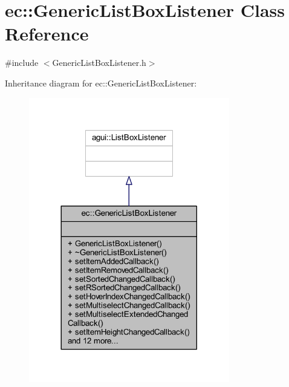 \hypertarget{classec_1_1_generic_list_box_listener}{}\section{ec\+:\+:Generic\+List\+Box\+Listener Class Reference}
\label{classec_1_1_generic_list_box_listener}


{\ttfamily \#include $<$Generic\+List\+Box\+Listener.\+h$>$}



Inheritance diagram for ec\+:\+:Generic\+List\+Box\+Listener\+:\nopagebreak
\begin{figure}[H]
\begin{center}
\leavevmode
\includegraphics[width=248pt]{classec_1_1_generic_list_box_listener__inherit__graph}
\end{center}
\end{figure}


